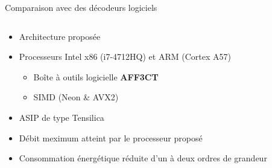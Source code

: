 \documentclass[t,compress,mathserif,12pt,xcolor=dvipsnames]{beamer}
\begin{document}
\begin{frame}[c]{Comparaison avec des décodeurs logiciels}
	\begin{columns}[T] %
	\begin{column}{.48\textwidth}
		\begin{itemize}
			\item<+-> Architecture proposée
			\item<+-> Processeurs Intel x86 (i7-4712HQ) et ARM (Cortex A57)
			\begin{itemize}
				\item<+-> Boîte à outils logicielle \textbf{AFF3CT}
				\item<+-> SIMD (Neon \& AVX2)
			\end{itemize}
			\item<+-> ASIP de type Tensilica
			\item<+-> Débit meximum atteint par le processeur proposé
			\item<+-> Consommation énergétique réduite d'un à deux ordres de grandeur
		\end{itemize}
	\end{column}

	\begin{column}{.48\textwidth}
\end{column}
\end{columns}
\end{frame}
\end{document}
